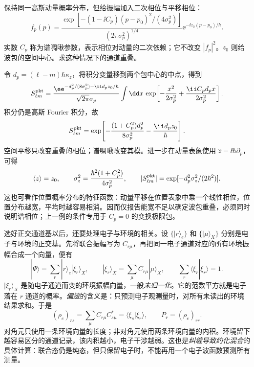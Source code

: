 \begin{exbox}[能谱相同的啁啾波包为何有不同重叠]
保持同一高斯动量概率分布，但给振幅加入二次相位与平移相位：
\begin{equation*}
 f_p(p)=\frac{\exp[-(1-\ii C_p)(p-p_0)^2/(4\sigma_p^2)]}
 {(2\pi\sigma_p^2)^{1/4}}
 \ee^{-\ii z_0(p-p_0)/\hbar}.
\end{equation*}
实数 $C_p$ 称为谱啁啾参数，表示相位对动量的二次依赖；它不改变 $|f_p|^2$。$z_0$ 则给波包的空间中心。求这种情况下的通道重叠。

令 $d_p=(\ell-m)\hbar\kappa_z$，将积分变量移到两个包中心的中点，得到
\begin{equation*}
 S_{\ell m}^{\rm pkt}
 =\frac{\ee^{-d_p^2/(8\sigma_p^2)-\ii d_pz_0/\hbar}}
 {\sqrt{2\pi}\sigma_p}
 \int\dd x\,\exp\!\left[-\frac{x^2}{2\sigma_p^2}
             +\frac{\ii C_pd_px}{2\sigma_p^2}\right].
\end{equation*}
积分仍是高斯 Fourier 积分，故
\begin{equation*}
 S_{\ell m}^{\rm pkt}
 =\exp\!\left[-\frac{(1+C_p^2)d_p^2}{8\sigma_p^2}
               -\frac{\ii d_pz_0}{\hbar}\right].
\end{equation*}
空间平移只改变重叠的相位；谱啁啾改变其模。进一步在动量表象使用 $\hat z=\ii\hbar\partial_p$，可得
\begin{equation*}
 \langle z\rangle=z_0,\qquad
 \sigma_z^2=\frac{\hbar^2(1+C_p^2)}{4\sigma_p^2},\qquad
 |S_{\ell m}^{\rm pkt}|=\exp[-d_p^2\sigma_z^2/(2\hbar^2)].
\end{equation*}
这也可看作位置概率分布的特征函数：动量平移在位置表象中乘一个线性相位，位置分布越宽，平均时越容易相消。因而仅报告能宽不足以确定波包重叠，必须同时说明谱相位；上一例的条件专用于 $C_p=0$ 的变换极限包。
\end{exbox}

选好正交通道基以后，还要处理电子与环境的相关。设 $\{|r\rangle_e\}$ 和 $\{|\mu\rangle_X\}$ 分别是电子与环境的正交基。先将联合振幅写为 $C_{r\mu}$，再把同一电子通道对应的所有环境振幅合成一个向量，便有
\begin{equation}
 |\Psi\rangle=\sum_r|r\rangle_e|\xi_r\rangle_X,\qquad
 |\xi_r\rangle_X=\sum_\mu C_{r\mu}|\mu\rangle_X,
 \qquad \sum_r\langle\xi_r|\xi_r\rangle=1.
 \label{eq:electron-environment-conditional-vectors}
\end{equation}
$|\xi_r\rangle_X$ 是随电子通道而变的环境振幅向量，一般\emph{未归一化}。它的范数平方就是电子落在 $r$ 通道的概率。\emph{偏迹}的含义是：只预测电子观测量时，对所有未读出的环境结果求和。于是
\begin{equation}
 (\rho_e)_{rs}=\sum_\mu C_{r\mu}C_{s\mu}^*
 =\langle\xi_s|\xi_r\rangle,
 \qquad P_r=(\rho_e)_{rr}.
 \label{eq:electron-coherence-environment-overlap}
\end{equation}
对角元只使用一条环境向量的长度；非对角元使用两条环境向量的内积。环境留下越容易区分的通道记录，该内积越小，电子干涉越弱。这也是\emph{纠缠导致约化混合}的具体计算：联合态仍是纯态，但只保留电子时，不能再用一个电子波函数预测所有测量。

